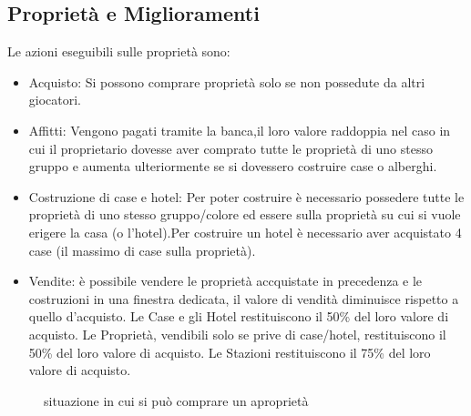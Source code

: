 \subsection{Proprietà e Miglioramenti}
Le azioni eseguibili sulle proprietà sono:
\begin{itemize}
    \item Acquisto: Si possono comprare proprietà solo se non possedute da altri giocatori.
    \item Affitti: Vengono pagati tramite la banca,\newline il loro valore raddoppia nel caso in cui il proprietario dovesse aver comprato tutte le proprietà di uno stesso gruppo e aumenta ulteriormente se si dovessero costruire case o alberghi.
    \item Costruzione di case e hotel: Per poter costruire è necessario possedere tutte le proprietà di uno stesso gruppo/colore ed essere sulla proprietà su cui si vuole erigere la casa (o l'hotel).\newline Per costruire un hotel è necessario aver acquistato 4 case (il massimo di case sulla proprietà).
    \item Vendite: è possibile vendere le proprietà accquistate in precedenza e le costruzioni in una finestra dedicata, il valore di vendità diminuisce rispetto a quello d'acquisto.\newline
    Le Case e gli Hotel restituiscono il 50\% del loro valore di acquisto.\newline
    Le Proprietà, vendibili solo se prive di case/hotel, restituiscono il 50\% del loro valore di acquisto.\newline
    Le Stazioni restituiscono il 75\% del loro valore di acquisto.
\end{itemize}
\begin{figure}[H]
    \centering
    \caption{situazione in cui si può comprare un aproprietà}
	\label{img:gamescreen8}
\end{figure}
